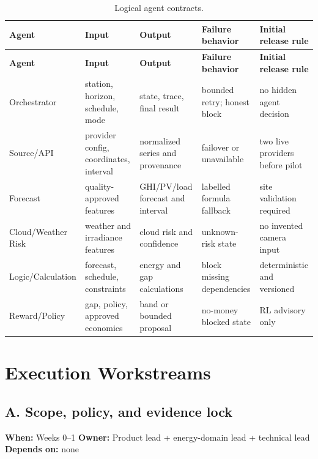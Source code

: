 \documentclass[11pt,a4paper]{article}
\begin{document}
\begin{footnotesize}
\begin{longtable}{@{}p{2.5cm}p{3.1cm}p{3.4cm}p{3.1cm}p{2.6cm}@{}}
\caption{Logical agent contracts.}\label{tab:agents}\\
\toprule
\textbf{Agent} & \textbf{Input} & \textbf{Output} & \textbf{Failure behavior} &
\textbf{Initial release rule}\\
\midrule
\endfirsthead
\toprule
\textbf{Agent} & \textbf{Input} & \textbf{Output} & \textbf{Failure behavior} &
\textbf{Initial release rule}\\
\midrule
\endhead
\bottomrule
\endfoot
Orchestrator & station, horizon, schedule, mode & state, trace, final result &
bounded retry; honest block & no hidden agent decision\\
Source/API & provider config, coordinates, interval & normalized series and provenance &
failover or unavailable & two live providers before pilot\\
Forecast & quality-approved features & GHI/PV/load forecast and interval &
labelled formula fallback & site validation required\\
Cloud/Weather Risk & weather and irradiance features & cloud risk and confidence &
unknown-risk state & no invented camera input\\
Logic/Calculation & forecast, schedule, constraints & energy and gap calculations &
block missing dependencies & deterministic and versioned\\
Reward/Policy & gap, policy, approved economics & band or bounded proposal &
no-money blocked state & RL advisory only\\
\end{longtable}
\end{footnotesize}

\section{Execution Workstreams}

\subsection{A. Scope, policy, and evidence lock}
\textbf{When:} Weeks 0--1 \quad
\textbf{Owner:} Product lead + energy-domain lead + technical lead \quad
\textbf{Depends on:} none
\end{document}
